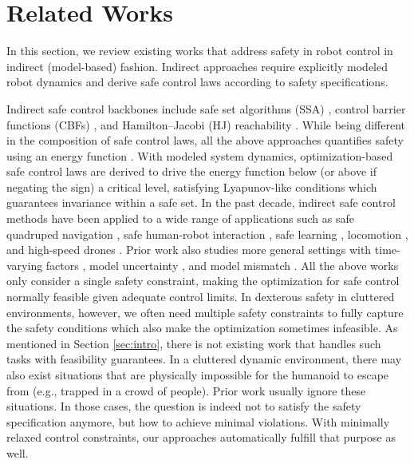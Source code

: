 \section{Related Works}
\label{sec:related}

In this section, we review existing works that address safety in robot control in indirect (model-based) fashion.
Indirect approaches require explicitly modeled robot dynamics and derive safe control laws according to safety specifications.




Indirect safe control backbones include safe set algorithms (SSA)  \cite{liu2014control, chen2023sis}, control barrier functions (CBFs) \cite{ames2016control, xiao2019control}, and Hamilton–Jacobi (HJ) reachability \cite{choi2021robust}.
While being different in the composition of safe control laws, all the above approaches quantifies safety using an energy function \cite{wei2019unified}.
With modeled system dynamics, optimization-based safe control laws are derived to drive the energy function below (or above if negating the sign) a critical level, satisfying Lyapunov-like conditions which guarantees invariance within a safe set.
In the past decade, indirect safe control methods have been applied to a wide range of applications such as safe quadruped navigation \cite{yun2024safe, he2024agile, molnar2021model}, safe human-robot interaction \cite{liu2023proactive, lin2017real, pandya2024multimodal, liu2022safe}, safe learning \cite{zhao2021zeroviolation}, locomotion \cite{choi2023constraint}, and high-speed drones \cite{singletary2022onboard}.
Prior work also studies more general settings with time-varying factors \cite{glotfelter2019hybrid, chen2023sia}, model uncertainty \cite{taylor2020adaptive, dawson2022safe}, and model mismatch \cite{taylor2020learning}.
All the above works only consider a single safety constraint, making the optimization for safe control normally feasible given adequate control limits.
In dexterous safety in cluttered environments, however, we often need multiple safety constraints to fully capture the safety conditions which also make the optimization sometimes infeasible.
As mentioned in Section \ref{sec:intro}, there is not existing work that handles such tasks with feasibility guarantees.
In a cluttered dynamic environment, there may also exist situations that are physically impossible for the humanoid to escape from (e.g., trapped in a crowd of people).
Prior work usually ignore these situations.
In those cases, the question is indeed not to satisfy the safety specification anymore, but how to achieve minimal violations.
With minimally relaxed control constraints, our approaches automatically fulfill that purpose as well.

